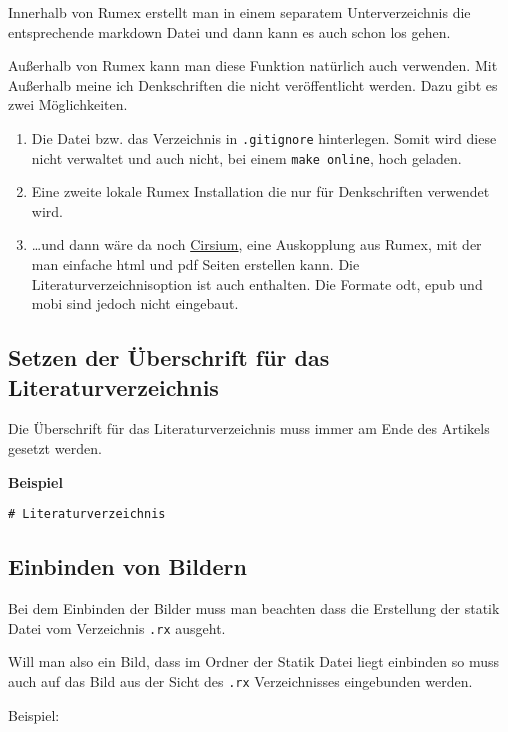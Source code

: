 Innerhalb von Rumex erstellt man in einem separatem Unterverzeichnis die
entsprechende markdown Datei und dann kann es auch schon los gehen.

Außerhalb von Rumex kann man diese Funktion natürlich auch verwenden.
Mit Außerhalb meine ich Denkschriften die nicht veröffentlicht werden.
Dazu gibt es zwei Möglichkeiten.

\begin{enumerate}
\def\labelenumi{\arabic{enumi}.}
\item
  Die Datei bzw. das Verzeichnis in \texttt{.gitignore} hinterlegen.
  Somit wird diese nicht verwaltet und auch nicht, bei einem
  \texttt{make online}, hoch geladen.
\item
  Eine zweite lokale Rumex Installation die nur für Denkschriften
  verwendet wird.
\item
  \ldots{}und dann wäre da noch
  \href{https://github.com/itbayer/cirsium}{Cirsium}, eine Auskopplung
  aus Rumex, mit der man einfache html und pdf Seiten erstellen kann.
  Die Literaturverzeichnisoption ist auch enthalten. Die Formate odt,
  epub und mobi sind jedoch nicht eingebaut.
\end{enumerate}

\subsection{Setzen der Überschrift für das
Literaturverzeichnis}\label{setzen-der-uxfcberschrift-fuxfcr-das-literaturverzeichnis}

Die Überschrift für das Literaturverzeichnis muss immer am Ende des
Artikels gesetzt werden.

\textbf{Beispiel}

\begin{verbatim}
# Literaturverzeichnis
\end{verbatim}

\subsection{Einbinden von Bildern}\label{einbinden-von-bildern}

Bei dem Einbinden der Bilder muss man beachten dass die Erstellung der
statik Datei vom Verzeichnis \texttt{.rx} ausgeht.

Will man also ein Bild, dass im Ordner der Statik Datei liegt einbinden
so muss auch auf das Bild aus der Sicht des \texttt{.rx} Verzeichnisses
eingebunden werden.

Beispiel:

